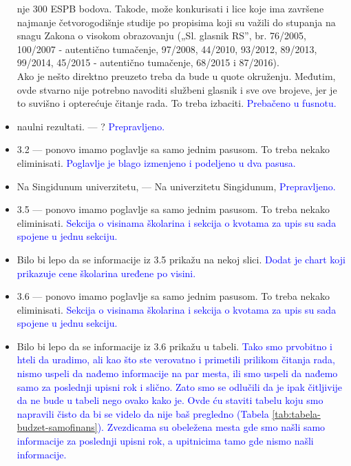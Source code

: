\documentclass[a4paper]{report}
\newcommand{\odgovor}[1]{\textcolor{blue}{#1}}
\begin{document}
\begin{itemize}
nje 300 ESPB bodova. Takode, može konkurisati i lice koje ima završene
najmanje četvorogodišnje studije po propisima koji su važili do stupanja
na snagu Zakona o visokom obrazovanju („Sl. glasnik RS”, br. 76/2005,
100/2007 - autentično tumačenje, 97/2008, 44/2010, 93/2012, 89/2013,
99/2014, 45/2015 - autentično tumačenje, 68/2015 i 87/2016). \\
Ako je nešto direktno preuzeto treba da bude u quote okruženju. Međutim, ovde stvarno nije potrebno navoditi službeni glasnik i sve ove brojeve, jer je to suvišno i opterećuje čitanje rada. To treba izbaciti. 
\odgovor{Prebačeno u fusnotu.}
\item naulni rezultati. --- ?
\odgovor{Prepravljeno.}
\item 3.2 --- ponovo imamo poglavlje sa samo jednim pasusom. To treba nekako eliminisati.
\odgovor{Poglavlje je blago izmenjeno i podeljeno u dva pasusa.}
\item Na Singidunum univerzitetu, --- Na univerzitetu Singidunum,
\odgovor{Prepravljeno.}
\item 3.5 --- ponovo imamo poglavlje sa samo jednim pasusom. To treba nekako eliminisati.
\odgovor{Sekcija o visinama školarina i sekcija o kvotama za upis su sada spojene u jednu sekciju.}
\item Bilo bi lepo da se informacije iz 3.5 prikažu na nekoj slici. \odgovor{Dodat je chart koji prikazuje cene školarina uređene po visini.}
\item 3.6 --- ponovo imamo poglavlje sa samo jednim pasusom. To treba nekako eliminisati.
\odgovor{Sekcija o visinama školarina i sekcija o kvotama za upis su sada spojene u jednu sekciju.}
\item Bilo bi lepo da se informacije iz 3.6 prikažu u tabeli. 
\odgovor{Tako smo prvobitno i hteli da uradimo, ali kao što ste verovatno i primetili prilikom čitanja rada, nismo uspeli da nađemo informacije na par mesta, ili smo uspeli da nađemo samo za poslednji upisni rok i slično. Zato smo se odlučili da je ipak čitljivije da ne bude u tabeli nego ovako kako je. Ovde ću staviti tabelu koju smo napravili čisto da bi se videlo da nije baš pregledno (Tabela \ref{tab:tabela-budzet-samofinans}). Zvezdicama su obeležena mesta gde smo našli samo informacije za poslednji upisni rok, a upitnicima tamo gde nismo našli informacije.}


\end{itemize}
\end{document}
